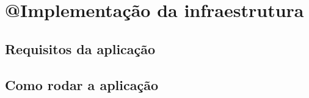 \chapter{@Implementação da infraestrutura}\label{implementação-da-infraestrutura}

\section{Requisitos da aplicação}\label{requisitos-da-aplicacao}


\section{Como rodar a aplicação}\label{como-rodar-a-aplicacao}





